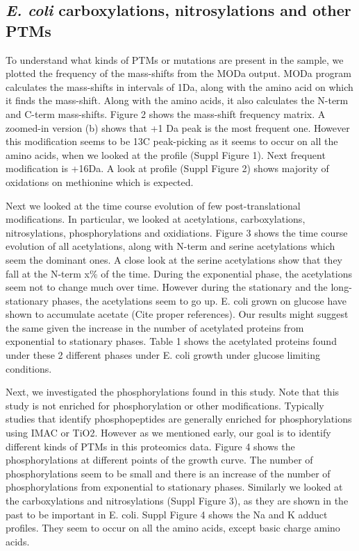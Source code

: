 \documentclass[12pt]{article}
\begin{document}
\subsection{\emph{E. coli} carboxylations, nitrosylations and other PTMs}
To understand what kinds of PTMs or mutations are present in the sample, we plotted the frequency of the mass-shifts from the MODa output. MODa program calculates the mass-shifts in intervals of 1Da, along with the amino acid on which it finds the mass-shift. Along with the amino acids, it also calculates the N-term and C-term mass-shifts. Figure 2 shows the mass-shift frequency matrix. A zoomed-in version (b) shows that +1 Da peak is the most frequent one. However this modification seems to be 13C peak-picking as it seems to occur on all the amino acids, when we looked at the profile (Suppl Figure 1). Next frequent modification is +16Da. A look at profile (Suppl Figure 2) shows majority of oxidations on methionine which is expected.

Next we looked at the time course evolution of few post-translational modifications. In particular, we looked at acetylations, carboxylations, nitrosylations, phosphorylations and oxidiations. Figure 3 shows the time course evolution of all acetylations, along with N-term and serine acetylations which seem the dominant ones. A close look at the serine acetylations show that they fall at the N-term x\% of the time. During the exponential phase, the acetylations seem not to change much over time. However during the stationary and the long-stationary phases, the acetylations seem to go up. E. coli grown on glucose have shown to accumulate acetate (Cite proper references). Our results might suggest the same given the increase in the number of acetylated proteins from exponential to stationary phases. Table 1 shows the acetylated proteins found under these 2 different phases under E. coli growth under glucose limiting conditions.

Next, we investigated the phosphorylations found in this study. Note that this study is not enriched for phosphorylation or other modifications. Typically studies that identify phosphopeptides are generally enriched for phosphorylations using IMAC or TiO2. However as we mentioned early, our goal is to identify different kinds of PTMs in this proteomics data. Figure 4 shows the phosphorylations at different points of the growth curve. The number of phosphorylations seem to be small and there is an increase of the number of phosphorylations from exponential to stationary phases. Similarly we looked at the carboxylations and nitrosylations (Suppl Figure 3), as they are shown in the past to be important in E. coli. Suppl Figure 4 shows the Na and K adduct profiles. They seem to occur on all the amino acids, except basic charge amino acids.
\end{document}
